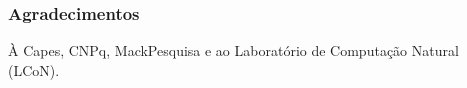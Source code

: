 \documentclass[aspectratio=43,hyperref={pdfpagelabels=false}]{beamer}
\begin{document}




\section*{}
\begin{frame}[t]
     \frametitle{Agradecimentos}
\vspace{1cm}
\center
     À Capes, CNPq, MackPesquisa e ao Laboratório de Computação Natural (LCoN).

\end{frame}
\end{document}
